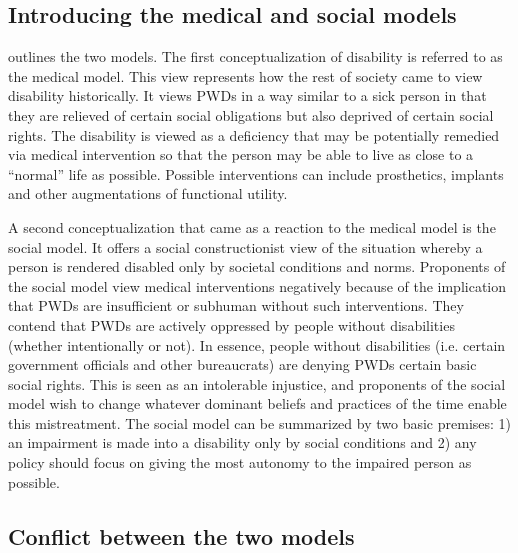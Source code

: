 \documentclass[a4paper]{article}
\begin{document}
\subsection{Introducing the medical and social models} 
\label{models}

\cite{winter2003development} outlines the two models. The first
conceptualization of disability is referred to as the medical model. This view
represents how the rest of society came to view disability historically. It
views PWDs in a way similar to a sick person in that they are relieved of
certain social obligations but also deprived of certain social rights. The
disability is viewed as a deficiency that may be potentially remedied via
medical intervention so that the person may be able to live as close to a
``normal'' life as possible. Possible interventions can include prosthetics,
implants and other augmentations of functional utility.

A second conceptualization that came as a reaction to the medical model is the
social model. It offers a social constructionist view of the situation whereby
a person is rendered disabled only by societal conditions and norms.
Proponents of the social model view medical interventions negatively because
of the implication that PWDs are insufficient or subhuman without such
interventions. They contend that PWDs are actively oppressed by people without
disabilities (whether intentionally or not). In essence, people without
disabilities (i.e. certain government officials and other bureaucrats) are
denying PWDs certain basic social rights. This is seen as an intolerable
injustice, and proponents of the social model wish to change whatever dominant
beliefs and practices of the time enable this mistreatment. The social model
can be summarized by two basic premises: 1) an impairment is made into a
disability only by social conditions and 2) any policy should focus on giving
the most autonomy to the impaired person as possible.



\subsection{Conflict between the two models}
\end{document}
